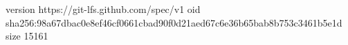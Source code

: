 version https://git-lfs.github.com/spec/v1
oid sha256:98a67dbac0e8ef46cf0661cbad90f0d21aed67c6e36b65bab8b753c3461b5e1d
size 15161
